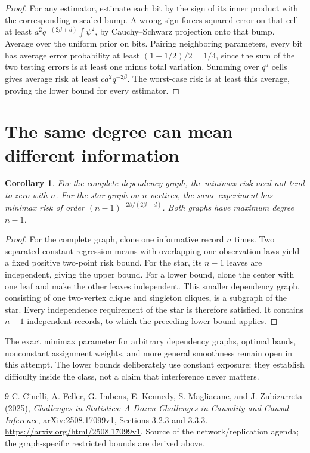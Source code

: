 \documentclass[11pt,a4paper]{article}
\newtheorem{corollary}[theorem]{Corollary}
\theoremstyle{definition}
\theoremstyle{remark}
\begin{document}
\begin{proof}
For any estimator, estimate each bit by the sign of its inner product with the corresponding rescaled bump. A wrong sign forces squared error on that cell at least
$a^2q^{-(2\beta+d)}\int\psi^2$, by Cauchy--Schwarz projection onto that bump. Average over the uniform prior on bits. Pairing neighboring parameters, every bit has average error probability at least $(1-1/2)/2=1/4$, since the sum of the two testing errors is at least one minus total variation. Summing over $q^d$ cells gives average risk at least $c a^2q^{-2\beta}$. The worst-case risk is at least this average, proving the lower bound for every estimator.
\end{proof}
\section{The same degree can mean different information}
\begin{corollary}
For the complete dependency graph, the minimax risk need not tend to zero with $n$. For the star graph on $n$ vertices, the same experiment has minimax risk of order $(n-1)^{-2\beta/(2\beta+d)}$. Both graphs have maximum degree $n-1$.
\end{corollary}
\begin{proof}
For the complete graph, clone one informative record $n$ times. Two separated constant regression means with overlapping one-observation laws yield a fixed positive two-point risk bound. For the star, its $n-1$ leaves are independent, giving the upper bound. For a lower bound, clone the center with one leaf and make the other leaves independent. This smaller dependency graph, consisting of one two-vertex clique and singleton cliques, is a subgraph of the star. Every independence requirement of the star is therefore satisfied. It contains $n-1$ independent records, to which the preceding lower bound applies.
\end{proof}
The exact minimax parameter for arbitrary dependency graphs, optimal bands, nonconstant assignment weights, and more general smoothness remain open in this attempt. The lower bounds deliberately use constant exposure; they establish difficulty inside the class, not a claim that interference never matters.
\begin{thebibliography}{9}
 C. Cinelli, A. Feller, G. Imbens, E. Kennedy, S. Magliacane, and J. Zubizarreta (2025), \emph{Challenges in Statistics: A Dozen Challenges in Causality and Causal Inference}, arXiv:2508.17099v1, Sections 3.2.3 and 3.3.3. \url{https://arxiv.org/html/2508.17099v1}. Source of the network/replication agenda; the graph-specific restricted bounds are derived above.
\end{thebibliography}
\end{document}
